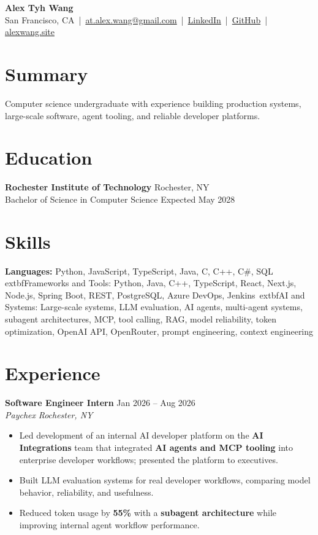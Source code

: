 \documentclass[10pt,letterpaper]{article}
\newif\ifresumeFirstRole
\newcommand{\resumeRole}[4]{%
  \ifresumeFirstRole
    \global\resumeFirstRolefalse
  \else
    \vspace{0pt plus 1fill}%
  \fi
  \textbf{#1} \hfill #2\\
  \textit{#3} \hfill \textit{#4}
}
\begin{document}
\begin{center}
{\Large \textbf{Alex Tyh Wang}}\\
San Francisco, CA \,|\, \href{mailto:at.alex.wang@gmail.com}{at.alex.wang@gmail.com} \,|\, \href{https://www.linkedin.com/in/alex-tyh-wang/}{LinkedIn} \,|\, \href{https://github.com/alextyhwang}{GitHub} \,|\, \href{https://alexwang.site}{alexwang.site}
\end{center}

\section*{Summary}
Computer science undergraduate with experience building production systems, large-scale software, agent tooling, and reliable developer platforms.

\section*{Education}
\textbf{Rochester Institute of Technology} \hfill Rochester, NY\\
Bachelor of Science in Computer Science \hfill Expected May 2028

\section*{Skills}
\textbf{Languages:} Python, JavaScript, TypeScript, Java, C, C++, C\#, SQL\\
	extbf{Frameworks and Tools:} Python, Java, C++, TypeScript, React, Next.js, Node.js, Spring Boot, REST, PostgreSQL, Azure DevOps, Jenkins\
	extbf{AI and Systems:} Large-scale systems, LLM evaluation, AI agents, multi-agent systems, subagent architectures, MCP, tool calling, RAG, model reliability, token optimization, OpenAI API, OpenRouter, prompt engineering, context engineering

\section*{Experience}
\resumeRole{Software Engineer Intern}{Jan 2026 -- Aug 2026}{Paychex}{Rochester, NY}
\begin{itemize}
  \item Led development of an internal AI developer platform on the \textbf{AI Integrations} team that integrated \textbf{AI agents and MCP tooling} into enterprise developer workflows; presented the platform to executives.
  \item Built LLM evaluation systems for real developer workflows, comparing model behavior, reliability, and usefulness.
  \item Reduced token usage by \textbf{55\%} with a \textbf{subagent architecture} while improving internal agent workflow performance.
\end{itemize}
\end{document}
